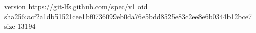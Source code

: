 version https://git-lfs.github.com/spec/v1
oid sha256:acf2a1db51521cee1bf0736099eb0da76e5bdd8525e83c2ee8e6b0344b12bce7
size 13194
